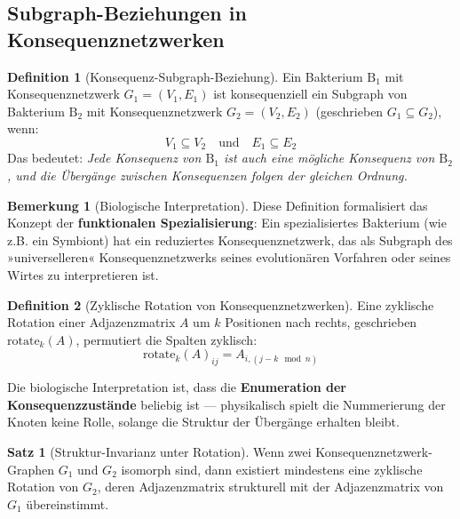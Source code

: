 \documentclass[a4paper,12pt]{article}
\theoremstyle{definition}
\newtheorem{definition}{Definition}
\newtheorem{satz}{Satz}
\newtheorem{bemerkung}{Bemerkung}
\begin{document}
\subsection{Subgraph-Beziehungen in Konsequenznetzwerken}

\begin{definition}[Konsequenz-Subgraph-Beziehung]
\label{def:subgraph_relation}
Ein Bakterium $\text{B}_1$ mit Konsequenznetzwerk $G_1 = (V_1, E_1)$ ist konsequenziell ein Subgraph von Bakterium $\text{B}_2$ mit Konsequenznetzwerk $G_2 = (V_2, E_2)$ (geschrieben $G_1 \subseteq G_2$), wenn:
\[
V_1 \subseteq V_2 \quad \text{und} \quad E_1 \subseteq E_2
\]
Das bedeutet: \textit{Jede Konsequenz von $\text{B}_1$ ist auch eine mögliche Konsequenz von $\text{B}_2$, und die Übergänge zwischen Konsequenzen folgen der gleichen Ordnung.}
\end{definition}

\begin{bemerkung}[Biologische Interpretation]
Diese Definition formalisiert das Konzept der \textbf{funktionalen Spezialisierung}: Ein spezialisiertes Bakterium (wie z.B. ein Symbiont) hat ein reduziertes Konsequenznetzwerk, das als Subgraph des »universelleren« Konsequenznetzwerks seines evolutionären Vorfahren oder seines Wirtes zu interpretieren ist.
\end{bemerkung}

\begin{definition}[Zyklische Rotation von Konsequenznetzwerken]
Eine zyklische Rotation einer Adjazenzmatrix $A$ um $k$ Positionen nach rechts, geschrieben $\text{rotate}_k(A)$, permutiert die Spalten zyklisch:
\[
\text{rotate}_k(A)_{ij} = A_{i, (j - k \mod n)}
\]

Die biologische Interpretation ist, dass die \textbf{Enumeration der Konsequenzzustände} beliebig ist --- physikalisch spielt die Nummerierung der Knoten keine Rolle, solange die Struktur der Übergänge erhalten bleibt.
\end{definition}

\begin{satz}[Struktur-Invarianz unter Rotation]
\label{satz:struktur_invarianz}
Wenn zwei Konsequenznetzwerk-Graphen $G_1$ und $G_2$ isomorph sind, dann existiert mindestens eine zyklische Rotation von $G_2$, deren Adjazenzmatrix strukturell mit der Adjazenzmatrix von $G_1$ übereinstimmt.
\end{satz}
\end{document}
